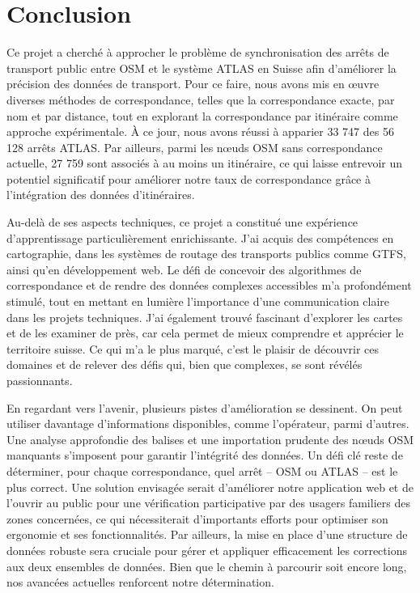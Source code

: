 \chapter*{Conclusion}


Ce projet a cherché à approcher le problème de synchronisation des arrêts de transport public entre OSM et le système ATLAS en Suisse afin d'améliorer la précision des données de transport. Pour ce faire, nous avons mis en œuvre diverses méthodes de correspondance, telles que la correspondance exacte, par nom et par distance, tout en explorant la correspondance par itinéraire comme approche expérimentale. À ce jour, nous avons réussi à apparier 33 747 des 56 128 arrêts ATLAS. Par ailleurs, parmi les nœuds OSM sans correspondance actuelle, 27 759 sont associés à au moins un itinéraire, ce qui laisse entrevoir un potentiel significatif pour améliorer notre taux de correspondance grâce à l'intégration des données d'itinéraires.

Au-delà de ses aspects techniques, ce projet a constitué une expérience d'apprentissage particulièrement enrichissante. J'ai acquis des compétences en cartographie, dans les systèmes de routage des transports publics comme GTFS, ainsi qu'en développement web. Le défi de concevoir des algorithmes de correspondance et de rendre des données complexes accessibles m'a profondément stimulé, tout en mettant en lumière l'importance d'une communication claire dans les projets techniques. J’ai également trouvé fascinant d’explorer les cartes et de les examiner de près, car cela permet de mieux comprendre et apprécier le territoire suisse. Ce qui m'a le plus marqué, c'est le plaisir de découvrir ces domaines et de relever des défis qui, bien que complexes, se sont révélés passionnants.

En regardant vers l'avenir, plusieurs pistes d'amélioration se dessinent. On peut utiliser davantage d’informations disponibles, comme l’opérateur, parmi d’autres. Une analyse approfondie des balises et une importation prudente des nœuds OSM manquants s’imposent pour garantir l’intégrité des données. Un défi clé reste de déterminer, pour chaque correspondance, quel arrêt – OSM ou ATLAS – est le plus correct. Une solution envisagée serait d’améliorer notre application web et de l’ouvrir au public pour une vérification participative par des usagers familiers des zones concernées, ce qui nécessiterait d’importants efforts pour optimiser son ergonomie et ses fonctionnalités. Par ailleurs, la mise en place d’une structure de données robuste sera cruciale pour gérer et appliquer efficacement les corrections aux deux ensembles de données. Bien que le chemin à parcourir soit encore long, nos avancées actuelles renforcent notre détermination.
